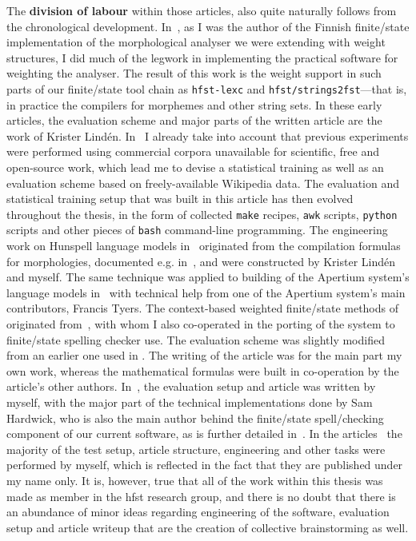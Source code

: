 \documentclass[officiallayout]{unihelcompling}
\begin{document}
The \textbf{division of labour} within those articles, also quite naturally
follows from the chronological development.
In~, as I was the author
of the Finnish finite\-/state implementation of the morphological analyser we
were extending with weight structures, I did much of the legwork in
implementing the practical software for weighting the analyser. The result of
this work is the weight support in such parts of our finite\-/state tool chain
as \texttt{hfst-lexc} and \texttt{hfst\-/strings2fst}---that is, in practice
the compilers for morphemes and other string sets. In these early articles, the
evaluation scheme and major parts of the written article are the work of
Krister Lindén.  In~ I already take into
account that previous experiments were performed using commercial corpora
unavailable for scientific, free and open-source work, which lead me to devise
a statistical training as well as an evaluation scheme based on
freely-available Wikipedia data. The evaluation and statistical training setup
that was built in this article has then evolved throughout the thesis, in the
form of collected \texttt{make} recipes, \texttt{awk} scripts, \texttt{python}
scripts and other pieces of \texttt{bash} command-line programming. The
engineering work on Hunspell language models
in~ originated from the
compilation formulas for morphologies, documented e.g.\/
in~\cite{linden2009hfst}, and were constructed by Krister Lindén and myself.
The same technique was applied to building of the Apertium system's language
models in~ with technical help from one of the
Apertium system's main contributors, Francis Tyers.  The context-based weighted
finite\-/state methods of  originated
from~\citet{silfverberg2010partofspeech}, with whom I also co-operated in the
porting of the system to finite\-/state spelling checker use. The evaluation
scheme was slightly modified from an earlier one used in
. The writing of the article
 was for the main part  my own work, whereas
the mathematical formulas were built in co-operation by the article's other
authors.  In~, the evaluation setup and article
was written by myself, with the major part of the technical implementations
done by Sam Hardwick, who is also the main author behind the finite\-/state
spell\-/checking component of our current software, as is further detailed
in~\citet{linden2011hfst}.  In the
articles~ the majority
of the test setup, article structure, engineering and other tasks were
performed by myself, which is reflected in the fact that they are published
under my name only. It is, however, true that all of the work within this
thesis was made as member in the \gls{hfst} research group, and there is no
doubt that there is an abundance of minor ideas regarding engineering of the
software, evaluation setup and article writeup that are the creation of
collective brainstorming as well.
\end{document}
